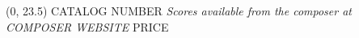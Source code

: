\documentclass[10pt]{article}
\begin{document}
\begin{textblock}{23}(0, 23.5)
CATALOG NUMBER \hfill
\textit{Scores available from the composer at COMPOSER WEBSITE} \hfill
PRICE
\end{textblock}
\end{document}
